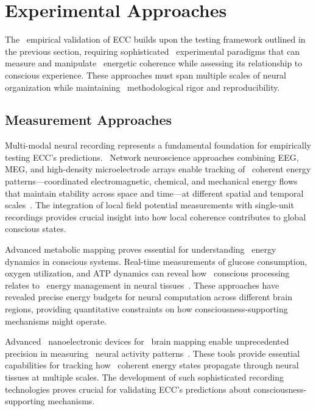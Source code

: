 \section{Experimental Approaches}

The~ empirical validation of ECC builds upon the testing framework outlined in the previous section, requiring sophisticated~ experimental paradigms that can measure and manipulate~ energetic coherence while assessing its relationship to conscious experience. These approaches must span multiple scales of neural organization while maintaining~ methodological rigor and reproducibility.

\subsection*{Measurement Approaches}

 Multi-modal neural recording represents a fundamental foundation for empirically testing ECC's predictions.~ Network neuroscience approaches combining EEG, MEG, and high-density microelectrode arrays enable tracking of~ coherent energy patterns—coordinated electromagnetic, chemical, and mechanical energy flows that maintain stability across space and time—at different spatial and temporal scales~\cite{Bassett2017, breakspear2005dynamics}. The integration of local field potential measurements with single-unit recordings provides crucial insight into how local coherence contributes to global conscious states.

 Advanced metabolic mapping proves essential for understanding~ energy dynamics in conscious systems. Real-time measurements of glucose consumption, oxygen utilization, and ATP dynamics can reveal how~ conscious processing relates to~ energy management in neural tissues~\cite{Howarth2012, haier1988cortical}. These approaches have revealed precise energy budgets for neural computation across different brain regions, providing quantitative constraints on how consciousness-supporting mechanisms might operate.

Advanced~ nanoelectronic devices for~ brain mapping enable unprecedented precision in measuring~ neural activity patterns~\cite{Kuzum2014}. These tools provide essential capabilities for tracking how~ coherent energy states propagate through neural tissues at multiple scales. The development of such sophisticated recording technologies proves crucial for validating ECC's predictions about consciousness-supporting mechanisms.

